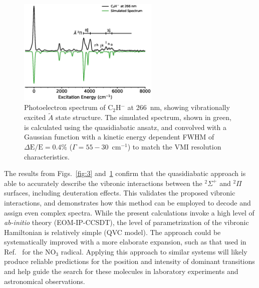 \documentclass[aip,graphicx]{revtex4-1}
\begin{document}
\begin{figure}[th!]
	\includegraphics[width=0.6\textwidth]{figures/Fig4}
	\caption{Photoelectron spectrum of C$_2$H$^-$ at 266~nm, showing vibrationally excited $\tilde{A}$ state structure. The simulated spectrum, shown in green, is calculated using the quasidiabatic ansatz, and convolved with a Gaussian function with a kinetic energy dependent FWHM of $\Delta\text{E}/\text{E} = 0.4\%$ ($\Gamma=55-30$~cm$^{-1}$) to match the VMI resolution characteristics.}
	\label{fig:4}
\end{figure}

The results from Figs.~\ref{fig:3} and~\ref{fig:4} confirm that the quasidiabatic approach is able to accurately describe the vibronic interactions between the $^2\Sigma^+$ and $^2\Pi$ surfaces, including deuteration effects. This validates the proposed vibronic interactions, and demonstrates how this method can be employed to decode and assign even complex spectra. While the present calculations invoke a high level of \emph{ab-initio} theory (EOM-IP-CCSDT), the level of parametrization of the vibronic Hamiltonian is relatively simple (QVC model). The approach could be systematically improved with a more elaborate expansion, such as that used in Ref.~ for the NO$_3$ radical. Applying this approach to similar systems will likely produce reliable predictions for the position and intensity of dominant transitions and help guide the search for these molecules in laboratory experiments and astronomical observations. 
\end{document}
